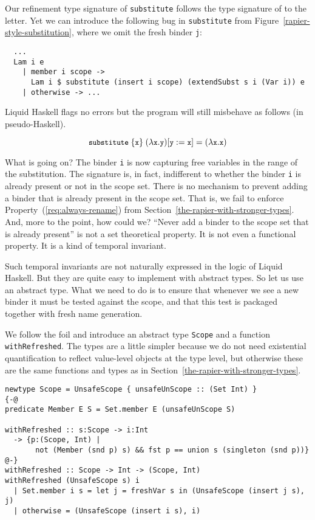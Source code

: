 \documentclass[sigconf, review]{acmart}
\newcommand{\tc}[1]{{\small\texttt{#1}}}
\newcommand{\codeblocksize}{\fontsize{6.5}{9}\selectfont}
\begin{document}
Our refinement type signature of \tc{substitute} follows the type signature of
\citeauthor{maclaurin23} to the letter.
Yet we can introduce the following bug in \tc{substitute} from
Figure~\ref{rapier-style-substitution}, where we omit the fresh binder \tc{j}:
\begin{verbatim}
  ...
  Lam i e
    | member i scope ->
      Lam i $ substitute (insert i scope) (extendSubst s i (Var i)) e
    | otherwise -> ...
\end{verbatim}
Liquid Haskell flags no errors but the program will still misbehave as
follows (in pseudo-Haskell).

$$\codeblocksize{\tc{substitute}~\{\tc{x}\}~(\lambda{}\tc{x}. \tc{y}) [\tc{y}:=\tc{x}] = (\lambda{}\tc{x}. \tc{x})}$$

What is going on? The binder \tc{i} is now capturing free variables in the
range of the substitution. The signature is, in fact, indifferent to whether
the binder \tc{i} is already present or not in the scope set. There is no
mechanism to prevent adding a binder that is already present in the scope set.
That is, we fail to enforce Property~(\ref{req:always-rename}) from Section~\ref{the-rapier-with-stronger-types}.
And, more to the point, how could we? “Never add a binder to the scope set that is already
present” is not a set theoretical property. It is not even a functional property.
It is a kind of temporal invariant.

Such temporal invariants are not naturally expressed in the logic of Liquid Haskell.
But they are quite easy to implement with abstract types. So let us use an abstract
type. What we need to do is to ensure that whenever we see a new binder it must
be tested against the scope, and that this test is packaged together with fresh
name generation.

We follow the foil and
introduce an abstract type \tc{Scope} and a function \tc{withRefreshed}. The types are a little
simpler because we do not need existential quantification to reflect value-level
objects at the type level, but otherwise these are the same functions and types
as in Section~\ref{the-rapier-with-stronger-types}.
\begin{verbatim}
newtype Scope = UnsafeScope { unsafeUnScope :: (Set Int) }
{-@
predicate Member E S = Set.member E (unsafeUnScope S)

withRefreshed :: s:Scope -> i:Int
  -> {p:(Scope, Int) |
       not (Member (snd p) s) && fst p == union s (singleton (snd p))}
@-}
withRefreshed :: Scope -> Int -> (Scope, Int)
withRefreshed (UnsafeScope s) i
  | Set.member i s = let j = freshVar s in (UnsafeScope (insert j s), j)
  | otherwise = (UnsafeScope (insert i s), i)
\end{verbatim}
\end{document}
